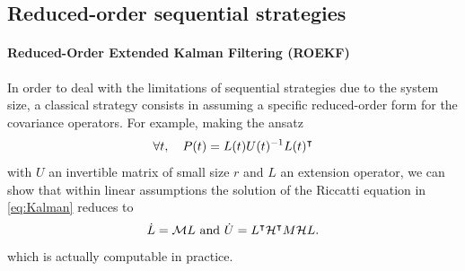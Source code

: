\subsection{Reduced-order sequential strategies}\label{sec:RO}

\paragraph{Reduced-Order Extended Kalman Filtering (ROEKF)}

In order to deal with the limitations of sequential strategies due to the system size, a classical strategy consists in assuming a specific reduced-order form for the covariance operators. For example, making the ansatz
\begin{equation}\label{eq:red-order-princ}
	\forall t,\quad P(t) = L(t) U(t)^{-1} L(t)^\intercal
\end{equation}
with $U$ an invertible matrix of small size $r$ and $L$ an extension operator, we can show that within linear assumptions the solution of the Riccatti equation in \eqref{eq:Kalman} reduces to
\begin{equation}\label{eq:reducedDynamics}
	\dot{L} = \mathcal{M} L \text{ and }
	\dot{U} = L^\intercal \mathcal{H}^\intercal M \mathcal{H} L.
\end{equation}
which is actually computable in practice.

